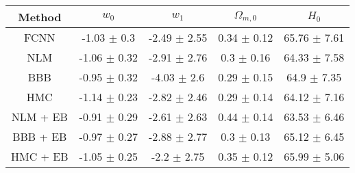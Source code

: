 \documentclass[convert={outext=.png}]{standalone}
\begin{document}
\centering
\label{tab:experimental_results}

\begin{tabular}{c c c c c}
\hline
\hline
Method & $w_0$ & $w_1$ & $\Omega_{m,0}$ & $H_0$ \\ \hline
 FCNN & -1.03 $\pm$ 0.3 & -2.49 $\pm$ 2.55 & 0.34 $\pm$ 0.12 & 65.76 $\pm$ 7.61 \\
 \hline
 NLM & -1.06 $\pm$ 0.32 & -2.91 $\pm$ 2.76 & 0.3 $\pm$ 0.16 & 64.33 $\pm$ 7.58 \\
 BBB & -0.95 $\pm$ 0.32 & -4.03 $\pm$ 2.6 & 0.29 $\pm$ 0.15 & 64.9 $\pm$ 7.35 \\
 HMC & -1.14 $\pm$ 0.23 & -2.82 $\pm$ 2.46 & 0.29 $\pm$ 0.14 & 64.12 $\pm$ 7.16 \\
 \hline
 NLM + EB & -0.91 $\pm$ 0.29 & -2.61 $\pm$ 2.63 & 0.44 $\pm$ 0.14 & 63.53 $\pm$ 6.46 \\
 BBB + EB & -0.97 $\pm$ 0.27 & -2.88 $\pm$ 2.77 & 0.3 $\pm$ 0.13 & 65.12 $\pm$ 6.45 \\
 HMC + EB & -1.05 $\pm$ 0.25 & -2.2 $\pm$ 2.75 & 0.35 $\pm$ 0.12 & 65.99 $\pm$ 5.06 \\
\hline
\hline
\end{tabular}
\end{document}
